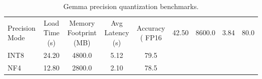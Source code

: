 \begin{table}[htbp]
  \centering
  \caption{Gemma precision quantization benchmarks.}
  \label{tab:quantization_study}
  \begin{tabular}{lcccc}
    \toprule
    Precision Mode & Load Time (s) & Memory Footprint (MB) & Avg Latency (s) & Accuracy (%
    \midrule
    FP16 & 42.50 & 8600.0 & 3.84 & 80.0 \\
    INT8 & 24.20 & 4800.0 & 5.12 & 79.5 \\
    NF4 & 12.80 & 2800.0 & 2.10 & 78.5 \\
    \bottomrule
  \end{tabular}
\end{table}